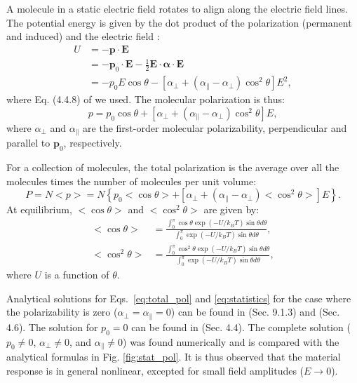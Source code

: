 \documentclass[12pt,letterpaper]{article}
\begin{document}
A molecule in a static electric field rotates to align along the electric field lines. The potential energy is given by the dot product of the polarization (permanent and induced) and the electric field \cite{bonin1997}:
\begin{align}\label{eq:potential}
U &= -\mathbf{p}\cdot\mathbf{E}\nonumber\\
&=-\mathbf{p}_0\cdot\mathbf{E} - \frac{1}{2}\mathbf{E}\cdot\mathbf{\boldsymbol\alpha}\cdot\mathbf{E}\nonumber\\
&= -p_0E\cos\theta-\left[\alpha_\bot + (\alpha_\parallel - \alpha_\bot)\cos^2\theta\right]E^2,
\end{align}
where Eq. (4.4.8) of \cite{boyd2008} we used. The molecular polarization is thus:
\begin{equation}\label{eq:single_pol}
 p = p_0\cos\theta+\left[\alpha_\bot + (\alpha_\parallel - \alpha_\bot)\cos^2\theta\right]E,
\end{equation}
where $\alpha_\bot$ and $\alpha_\parallel$ are the first-order molecular polarizability, perpendicular and parallel to $\mathbf{p}_0$, respectively.

For a collection of molecules, the total polarization is the average over all the molecules times the number of molecules per unit volume:
\begin{equation}\label{eq:total_pol}
 P=N<p>=N\left\lbrace p_0<\cos\theta>+\left[\alpha_\bot + (\alpha_\parallel - \alpha_\bot)<\cos^2\theta>\right]E\right\rbrace.
\end{equation}
At equilibrium, $<\cos\theta>$ and $<\cos^2\theta>$ are given by:
\begin{subequations}\label{eq:statistics}
 \begin{align}
  <\cos\theta>&=\frac{\int_0^\pi\cos\theta\exp(-U/k_BT)\sin\theta d\theta}{\int_0^\pi\exp(-U/k_BT)\sin\theta d\theta},\\
  <\cos^2\theta>&=\frac{\int_0^\pi\cos^2\theta\exp(-U/k_BT)\sin\theta d\theta}{\int_0^\pi\exp(-U/k_BT)\sin\theta d\theta},
 \end{align}
\end{subequations}
where $U$ is a function of $\theta$. 

Analytical solutions for Eqs.~\eqref{eq:total_pol} and \eqref{eq:statistics} for the case where the polarizability is zero ($\alpha_\bot = \alpha_\parallel=0$) can be found in \cite{hook1991} (Sec. 9.1.3) and \cite{jackson1999} (Sec. 4.6). The solution for $p_0 = 0$ can be found in \cite{boyd2008} (Sec. 4.4). The complete solution ($p_0\neq 0$, $\alpha_\bot\neq 0$, and $\alpha_\parallel\neq 0$) was found numerically and is compared with the analytical formulas in Fig. \ref{fig:stat_pol}. It is thus observed that the material response is in general nonlinear, excepted for small field amplitudes ($E\rightarrow 0$).
\end{document}
